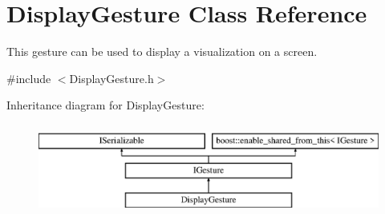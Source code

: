 \hypertarget{class_display_gesture}{}\section{Display\+Gesture Class Reference}
\label{class_display_gesture}


This gesture can be used to display a visualization on a screen.  




{\ttfamily \#include $<$Display\+Gesture.\+h$>$}

Inheritance diagram for Display\+Gesture\+:\begin{figure}[H]
\begin{center}
\leavevmode
\includegraphics[height=3.000000cm]{class_display_gesture}
\end{center}
\end{figure}
